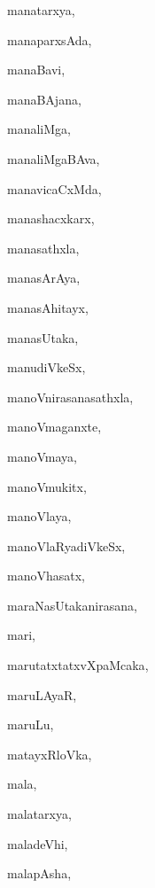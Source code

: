 \begin{multicols}{3}
{\noindent
{manatarxya}, \pageref{manatarxya}

\noindent
{manaparxsAda}, \pageref{manaparxsAda}

\noindent
{manaBavi}, \pageref{manaBavi}

\noindent
{manaBAjana}, \pageref{manaBAjana}

\noindent
{manaliMga}, \pageref{manaliMga}

\noindent
{manaliMgaBAva}, \pageref{manaliMgaBAva}

\noindent
{manavicaCxMda}, \pageref{manavicaCxMda}

\noindent
{manashacxkarx}, \pageref{manashacxkarx}

\noindent
{manasathxla}, \pageref{manasathxla}

\noindent
{manasArAya}, \pageref{manasArAya}

\noindent
{manasAhitayx}, \pageref{manasAhitayx}

\noindent
{manasUtaka}, \pageref{manasUtaka}

\noindent
{manudiVkeSx}, \pageref{manudiVkeSx}

\noindent
{manoVnirasanasathxla}, \pageref{manoVnirasanasathxla}

\noindent
{manoVmaganxte}, \pageref{manoVmaganxte}

\noindent
{manoVmaya}, \pageref{manoVmaya}

\noindent
{manoVmukitx}, \pageref{manoVmukitx}

\noindent
{manoVlaya}, \pageref{manoVlaya}

\noindent
{manoVlaRyadiVkeSx}, \pageref{manoVlaRyadiVkeSx}

\noindent
{manoVhasatx}, \pageref{manoVhasatx}

\noindent
{maraNasUtakanirasana}, \pageref{maraNasUtakanirasana}

\noindent
{mari}, \pageref{mari}

\noindent
{marutatxtatxvXpaMcaka}, \pageref{marutatxtatxvXpaMcaka}

\noindent
{maruLAyaR}, \pageref{maruLAyaR}

\noindent
{maruLu}, \pageref{maruLu}

\noindent
{matayxRloVka}, \pageref{matayxRloVka}

\noindent
{mala}, \pageref{mala}

\noindent
{malatarxya}, \pageref{malatarxya}

\noindent
{maladeVhi}, \pageref{maladeVhi}

\noindent
{malapAsha}, \pageref{malapAsha}

}
\end{multicols}
